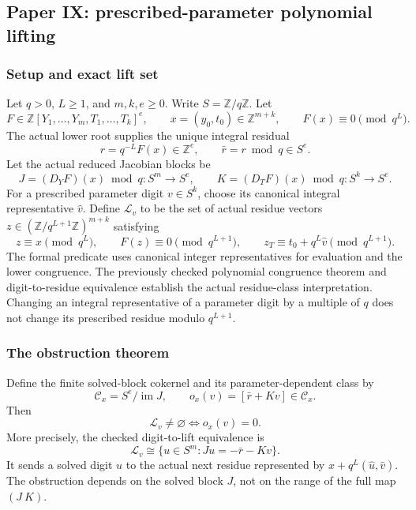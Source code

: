 \hypertarget{cont8:paper-ix-prescribed-parameter-polynomial-lifting}{%
\subsection{Paper IX: prescribed-parameter polynomial
lifting}\label{cont8:paper-ix-prescribed-parameter-polynomial-lifting}}

\hypertarget{cont8:setup-and-exact-lift-set}{%
\subsubsection{Setup and exact lift
set}\label{cont8:setup-and-exact-lift-set}}

Let \(q>0\), \(L\ge1\), and \(m,k,e\ge0\). Write
\(S=\mathbb Z/q\mathbb Z\). Let \[
F\in\mathbb Z[Y_1,\ldots,Y_m,T_1,\ldots,T_k]^e,
\qquad x=(y_0,t_0)\in\mathbb Z^{m+k},
\qquad F(x)\equiv0\pmod{q^L}.
\] The actual lower root supplies the unique integral residual \[
r=q^{-L}F(x)\in\mathbb Z^e,\qquad \bar r=r\bmod q\in S^e.
\] Let the actual reduced Jacobian blocks be \[
J=(D_YF)(x)\bmod q:S^m\to S^e,
\qquad K=(D_TF)(x)\bmod q:S^k\to S^e.
\] For a prescribed parameter digit \(v\in S^k\), choose its canonical
integral representative \(\widehat v\). Define \(\mathcal L_v\) to be
the set of actual residue vectors
\(z\in(\mathbb Z/q^{L+1}\mathbb Z)^{m+k}\) satisfying \[
z\equiv x\pmod{q^L},\qquad F(z)\equiv0\pmod{q^{L+1}},\qquad
z_T\equiv t_0+q^L\widehat v\pmod{q^{L+1}}.
\] The formal predicate uses canonical integer representatives for
evaluation and the lower congruence. The previously checked polynomial
congruence theorem and digit-to-residue equivalence establish the actual
residue-class interpretation. Changing an integral representative of a
parameter digit by a multiple of \(q\) does not change its prescribed
residue modulo \(q^{L+1}\).

\hypertarget{cont8:the-obstruction-theorem}{%
\subsubsection{The obstruction theorem}\label{cont8:the-obstruction-theorem}}

Define the finite solved-block cokernel and its parameter-dependent
class by \[
\mathcal C_x=S^e/\operatorname{im}J,
\qquad o_x(v)=[\bar r+Kv]\in\mathcal C_x.
\] Then \[
\boxed{\mathcal L_v\ne\varnothing\iff o_x(v)=0.}
\] More precisely, the checked digit-to-lift equivalence is \[
\boxed{\mathcal L_v\cong\{u\in S^m:Ju=-\bar r-Kv\}.}
\] It sends a solved digit \(u\) to the actual next residue represented
by \(x+q^L(\widehat u,\widehat v)\). The obstruction depends on the
solved block \(J\), not on the range of the full map \((J\ K)\).

